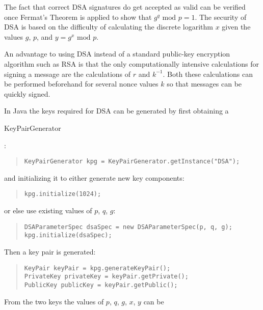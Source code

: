 The fact that correct DSA signatures do get accepted as valid can be verified once Fermat's Theorem
is applied to show that $g^q\mbox{ mod }p=1$. The security of DSA is based on
the difficulty of calculating the discrete logarithm $x$ given the values $g$, $p$,
and $y=g^x\mbox{ mod }p$.

An advantage to using DSA instead of a standard public-key encryption algorithm such as RSA
is that the only computationally intensive calculations for signing a message are the calculations
of $r$ and $k^{-1}$. Both these calculations can be performed beforehand for several
nonce values $k$ so that messages can be quickly signed.

In Java the keys required for DSA can be generated by first obtaining a
\begin{code}KeyPairGenerator\end{code}:
\begin{quote}\begin{code}\begin{verbatim}
KeyPairGenerator kpg = KeyPairGenerator.getInstance("DSA");
\end{verbatim}\end{code}\end{quote}
and initializing it to either generate new key components:
\begin{quote}\begin{code}\begin{verbatim}
kpg.initialize(1024);
\end{verbatim}\end{code}\end{quote}
or else use existing values of $p$, $q$, $g$:
\begin{quote}\begin{code}\begin{verbatim}
DSAParameterSpec dsaSpec = new DSAParameterSpec(p, q, g);
kpg.initialize(dsaSpec);
\end{verbatim}\end{code}\end{quote}
Then a key pair is generated:
\begin{quote}\begin{code}\begin{verbatim}
KeyPair keyPair = kpg.generateKeyPair();
PrivateKey privateKey = keyPair.getPrivate();
PublicKey publicKey = keyPair.getPublic();
\end{verbatim}\end{code}\end{quote}
From the two keys the values of $p$, $q$, $g$, $x$, $y$ can be
